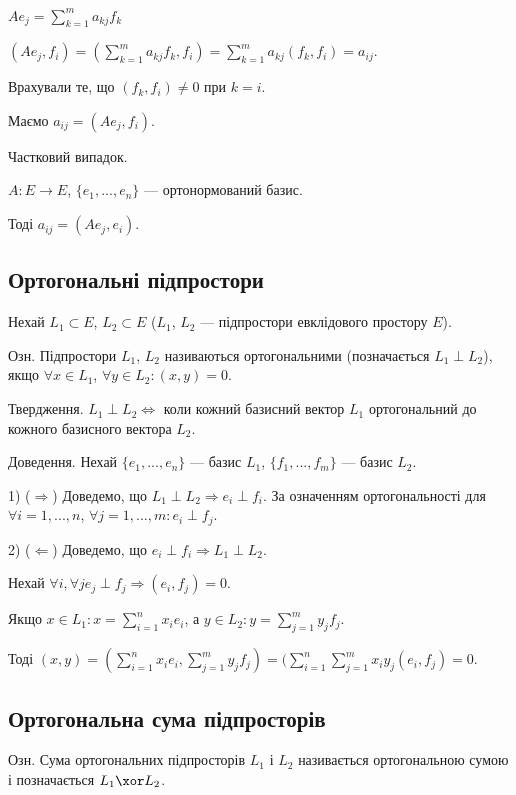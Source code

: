 $A e_j = \sum\limits_{k=1}^m a_{kj} f_k$

$(A e_j, f_i)
= (\sum\limits_{k=1}^m a_{kj} f_k, f_i)
= \sum\limits_{k=1}^m a_{kj} (f_k, f_i)
= a_{ij}$.

Врахували те, що $(f_k, f_i) \neq 0$ при $k = i$.

Маємо $a_{ij} = (A e_j, f_i)$.

Частковий випадок.

$A: E \rightarrow E$, $\{e_1, ..., e_n\}$ --- ортонормований базис.

Тоді $a_{ij} = (A e_j, e_i)$.

\subsection*{Ортогональні підпростори} %

Нехай $L_1 \subset E$, $L_2 \subset E$ ($L_1$, $L_2$ --- підпростори евклідового простору $E$).

Озн. Підпростори $L_1$, $L_2$ називаються ортогональними (позначається $L_1 \perp L_2$),
якщо $\forall x \in L_1$, $\forall y \in L_2: (x,y) = 0$.

Твердження. $L_1 \perp L_2 \Leftrightarrow$ коли кожний базисний вектор $L_1$ ортогональний до
кожного базисного вектора $L_2$.
 

Доведення.
Нехай $\{e_1, ..., e_n\}$ --- базис $L_1$, $\{f_1, ..., f_m\}$ --- базис $L_2$.

1) ($\Rightarrow$) Доведемо, що $L_1 \perp L_2 \Rightarrow e_i \perp f_i$.
За означенням ортогональності для $\forall i = 1, ..., n$, $\forall j = 1, ..., m: e_i \perp f_j$.

2) ($\Leftarrow$) Доведемо, що $e_i \perp f_i \Rightarrow L_1 \perp L_2$.

Нехай $\forall i, \forall j e_j \perp f_j \Rightarrow (e_i, f_j) = 0$.

Якщо $x \in L_1: x = \sum\limits_{i=1}^n x_i e_i$, а $y \in L_2: y = \sum\limits_{j=1}^m y_j f_j$.

Тоді $(x,y)
= (\sum\limits_{i=1}^n x_i e_i, \sum\limits_{j=1}^m y_j f_j)
= (\sum\limits_{i=1}^n \sum\limits_{j=1}^m x_i y_j( e_i, f_j)
= 0.$

\subsection*{Ортогональна сума підпросторів}

Озн. Сума ортогональних підпросторів $L_1$ і $L_2$ називається ортогональною
сумою і позначається $L_1 \xor L_2$.

